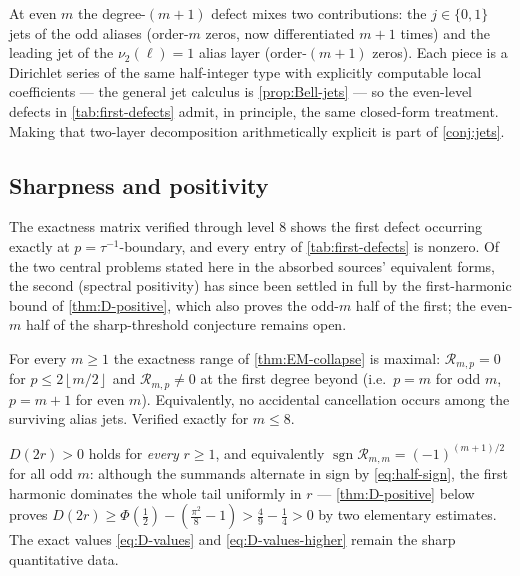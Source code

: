 \documentclass[11pt,oneside]{article}
\numberwithin{equation}{section}
\theoremstyle{definition}
\theoremstyle{remark}
\newcommand{\vtwo}{\nu_2}
\newcommand{\floor}[1]{\left\lfloor #1\right\rfloor}
\newcommand{\sgn}{\operatorname{sgn}}
\newcommand{\defect}{\mathcal R}
\begin{document}
\begin{remark}
At even $m$ the degree-$(m{+}1)$ defect mixes two contributions: the
$j\in\{0,1\}$ jets of the odd aliases (order-$m$ zeros, now
differentiated $m{+}1$ times) and the leading jet of the
$\vtwo(\ell)=1$ alias layer (order-$(m{+}1)$ zeros).  Each piece is a
Dirichlet series of the same half-integer type with explicitly
computable local coefficients --- the general jet calculus is
\cref{prop:Bell-jets} --- so the even-level defects in
\cref{tab:first-defects} admit, in principle, the same closed-form
treatment.  Making that two-layer decomposition arithmetically
explicit is part of \cref{conj:jets}.
\end{remark}

\subsection{Sharpness and positivity}

The exactness matrix verified through level $8$ shows the first defect
occurring exactly at $p=\tau^{-1}$-boundary, and every entry of
\cref{tab:first-defects} is nonzero.  Of the two central problems
stated here in the absorbed sources' equivalent forms, the second
(spectral positivity) has since been settled in full by the
first-harmonic bound of \cref{thm:D-positive}, which also proves the
odd-$m$ half of the first; the even-$m$ half of the sharp-threshold
conjecture remains open.

\begin{conjecture}
\label{conj:exact-degree}
For every $m\ge1$ the exactness range of \cref{thm:EM-collapse} is
maximal: $\defect_{m,p}=0$ for $p\le2\floor{m/2}$ and
$\defect_{m,p}\ne0$ at the first degree beyond
(i.e.\ $p=m$ for odd $m$, $p=m+1$ for even $m$).  Equivalently, no
accidental cancellation occurs among the surviving alias jets.
Verified exactly for $m\le8$.
\end{conjecture}

\begin{remark}
\label{conj:positivity}
$D(2r)>0$ holds for \emph{every} $r\ge1$, and equivalently
$\sgn\defect_{m,m}=(-1)^{(m+1)/2}$ for all odd $m$: although the
summands alternate in sign by \eqref{eq:half-sign}, the first
harmonic dominates the whole tail uniformly in $r$ ---
\cref{thm:D-positive} below proves
$D(2r)\ge\Phi(\tfrac12)-(\tfrac{\pi^2}8-1)>\tfrac49-\tfrac14>0$
by two elementary estimates.  The exact values \eqref{eq:D-values}
and \eqref{eq:D-values-higher} remain the sharp quantitative data.
\end{remark}
\end{document}
